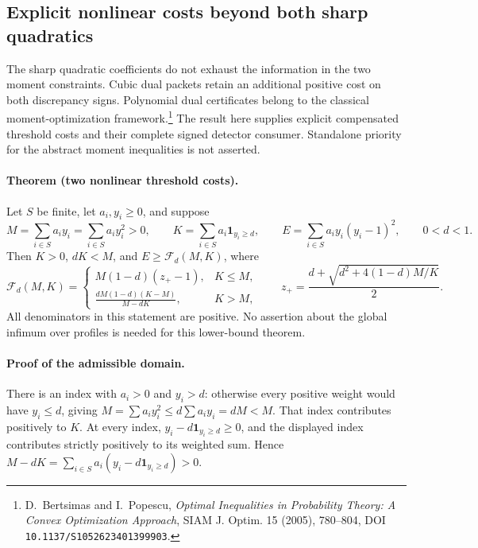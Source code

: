 \subsection{Explicit nonlinear costs beyond both sharp quadratics}
\label{sec:nonlinear-threshold-cost}

The sharp quadratic coefficients do not exhaust the information in the two
moment constraints.  Cubic dual packets retain an additional positive cost
on both discrepancy signs.  Polynomial dual certificates belong to the
classical moment-optimization framework.\footnote{D.~Bertsimas and I.~Popescu,
\emph{Optimal Inequalities in Probability Theory: A Convex Optimization
Approach}, SIAM J. Optim. 15 (2005), 780--804,
DOI \texttt{10.1137/S1052623401399903}.}
The result here supplies explicit compensated threshold costs and their
complete signed detector consumer.  Standalone priority for the abstract
moment inequalities is not asserted.

\paragraph{Theorem (two nonlinear threshold costs).}
Let \(S\) be finite, let \(a_i,y_i\ge0\), and suppose
\[
 M=\sum_{i\in S}a_i y_i=\sum_{i\in S}a_i y_i^2>0,\qquad
 K=\sum_{i\in S}a_i\mathbf1_{y_i\ge d},\qquad
 E=\sum_{i\in S}a_i y_i(y_i-1)^2,\qquad 0<d<1.
\]
Then \(K>0\), \(dK<M\), and \(E\ge\mathcal F_d(M,K)\), where
\begin{equation}
 \mathcal F_d(M,K)=
 \begin{cases}
 M(1-d)(z_+-1),&K\le M,\\[2pt]
 \displaystyle\frac{dM(1-d)(K-M)}{M-dK},&K>M,
 \end{cases}
 \qquad
 z_+=\frac{d+\sqrt{d^2+4(1-d)M/K}}2.
 \label{eq:nonlinear-threshold-cost}
\end{equation}
All denominators in this statement are positive.  No assertion about the
global infimum over profiles is needed for this lower-bound theorem.

\paragraph{Proof of the admissible domain.}
There is an index with \(a_i>0\) and \(y_i>d\): otherwise every positive
weight would have \(y_i\le d\), giving
\(M=\sum a_i y_i^2\le d\sum a_i y_i=dM<M\).
That index contributes positively to \(K\).  At every index,
\(y_i-d\mathbf1_{y_i\ge d}\ge0\), and the displayed index contributes
strictly positively to its weighted sum.  Hence
\(M-dK=\sum_{i\in S}a_i(y_i-d\mathbf1_{y_i\ge d})>0\).

